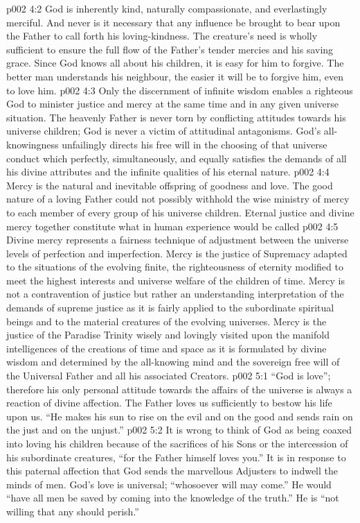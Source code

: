 \vs p002 4:2 God is inherently kind, naturally compassionate, and everlastingly merciful. And never is it necessary that any influence be brought to bear upon the Father to call forth his loving\hyp{}kindness. The creature’s need is wholly sufficient to ensure the full flow of the Father’s tender mercies and his saving grace. Since God knows all about his children, it is easy for him to forgive. The better man understands his neighbour, the easier it will be to forgive him, even to love him.
\vs p002 4:3 \pc Only the discernment of infinite wisdom enables a righteous God to minister justice and mercy at the same time and in any given universe situation. The heavenly Father is never torn by conflicting attitudes towards his universe children; God is never a victim of attitudinal antagonisms. God’s all\hyp{}knowingness unfailingly directs his free will in the choosing of that universe conduct which perfectly, simultaneously, and equally satisfies the demands of all his divine attributes and the infinite qualities of his eternal nature.
\vs p002 4:4 Mercy is the natural and inevitable offspring of goodness and love. The good nature of a loving Father could not possibly withhold the wise ministry of mercy to each member of every group of his universe children. Eternal justice and divine mercy together constitute what in human experience would be called 
\vs p002 4:5 Divine mercy represents a fairness technique of adjustment between the universe levels of perfection and imperfection. Mercy is the justice of Supremacy adapted to the situations of the evolving finite, the righteousness of eternity modified to meet the highest interests and universe welfare of the children of time. Mercy is not a contravention of justice but rather an understanding interpretation of the demands of supreme justice as it is fairly applied to the subordinate spiritual beings and to the material creatures of the evolving universes. Mercy is the justice of the Paradise Trinity wisely and lovingly visited upon the manifold intelligences of the creations of time and space as it is formulated by divine wisdom and determined by the all\hyp{}knowing mind and the sovereign free will of the Universal Father and all his associated Creators.
\vs p002 5:1 “God is love”; therefore his only personal attitude towards the affairs of the universe is always a reaction of divine affection. The Father loves us sufficiently to bestow his life upon us. “He makes his sun to rise on the evil and on the good and sends rain on the just and on the unjust.”
\vs p002 5:2 \pc It is wrong to think of God as being coaxed into loving his children because of the sacrifices of his Sons or the intercession of his subordinate creatures, “for the Father himself loves you.” It is in response to this paternal affection that God sends the marvellous Adjusters to indwell the minds of men. God’s love is universal; “whosoever will may come.” He would “have all men be saved by coming into the knowledge of the truth.” He is “not willing that any should perish.”
